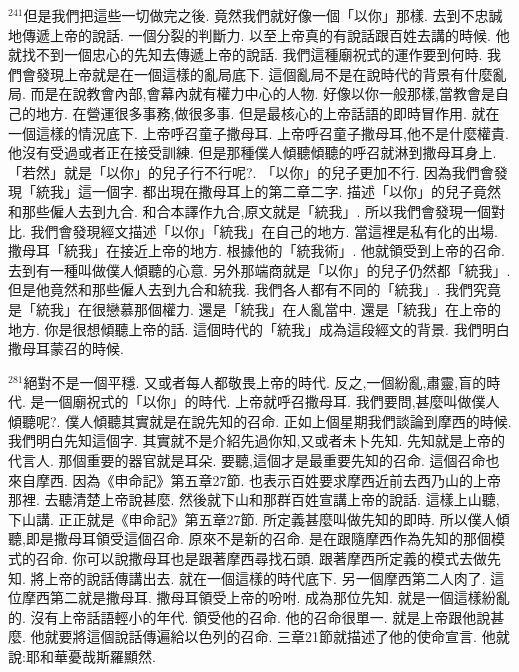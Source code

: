 \documentclass{book}
\begin{document}
$^{241}$但是我們把這些一切做完之後.
竟然我們就好像一個「以你」那樣.
去到不忠誠地傳遞上帝的說話.
一個分裂的判斷力.
以至上帝真的有說話跟百姓去講的時候.
他就找不到一個忠心的先知去傳遞上帝的說話.
我們這種廟祝式的運作要到何時.
我們會發現上帝就是在一個這樣的亂局底下.
這個亂局不是在說時代的背景有什麼亂局.
而是在說教會內部,會幕內就有權力中心的人物.
好像以你一般那樣,當教會是自己的地方.
在營運很多事務,做很多事.
但是最核心的上帝話語的即時冒作用.
就在一個這樣的情況底下.
上帝呼召童子撒母耳.
上帝呼召童子撒母耳,他不是什麼權貴.
他沒有受過或者正在接受訓練.
但是那種僕人傾聽傾聽的呼召就淋到撒母耳身上.
「若然」就是「以你」的兒子行不行呢?.
「以你」的兒子更加不行.
因為我們會發現「統我」這一個字.
都出現在撒母耳上的第二章二字.
描述「以你」的兒子竟然和那些僱人去到九合.
和合本譯作九合,原文就是「統我」.
所以我們會發現一個對比.
我們會發現經文描述「以你」「統我」在自己的地方.
當這裡是私有化的出場.
撒母耳「統我」在接近上帝的地方.
根據他的「統我術」.
他就領受到上帝的召命.
去到有一種叫做僕人傾聽的心意.
另外那端商就是「以你」的兒子仍然都「統我」.
但是他竟然和那些僱人去到九合和統我.
我們各人都有不同的「統我」.
我們究竟是「統我」在很戀慕那個權力.
還是「統我」在人亂當中.
還是「統我」在上帝的地方.
你是很想傾聽上帝的話.
這個時代的「統我」成為這段經文的背景.
我們明白撒母耳蒙召的時候.

$^{281}$絕對不是一個平穩.
又或者每人都敬畏上帝的時代.
反之,一個紛亂,肅靈,盲的時代.
是一個廟祝式的「以你」的時代.
上帝就呼召撒母耳.
我們要問,甚麼叫做僕人傾聽呢?.
僕人傾聽其實就是在說先知的召命.
正如上個星期我們談論到摩西的時候.
我們明白先知這個字.
其實就不是介紹先過你知,又或者未卜先知.
先知就是上帝的代言人.
那個重要的器官就是耳朵.
要聽,這個才是最重要先知的召命.
這個召命也來自摩西.
因為《申命記》第五章27節.
也表示百姓要求摩西近前去西乃山的上帝那裡.
去聽清楚上帝說甚麼.
然後就下山和那群百姓宣講上帝的說話.
這樣上山聽,下山講.
正正就是《申命記》第五章27節.
所定義甚麼叫做先知的即時.
所以僕人傾聽,即是撒母耳領受這個召命.
原來不是新的召命.
是在跟隨摩西作為先知的那個模式的召命.
你可以說撒母耳也是跟著摩西尋找石頭.
跟著摩西所定義的模式去做先知.
將上帝的說話傳講出去.
就在一個這樣的時代底下.
另一個摩西第二人肉了.
這位摩西第二就是撒母耳.
撒母耳領受上帝的吩咐.
成為那位先知.
就是一個這樣紛亂的.
沒有上帝話語輕小的年代.
領受他的召命.
他的召命很單一.
就是上帝跟他說甚麼.
他就要將這個說話傳遍給以色列的召命.
三章21節就描述了他的使命宣言.
他就說:耶和華憂哉斯羅顯然.
\end{document}
